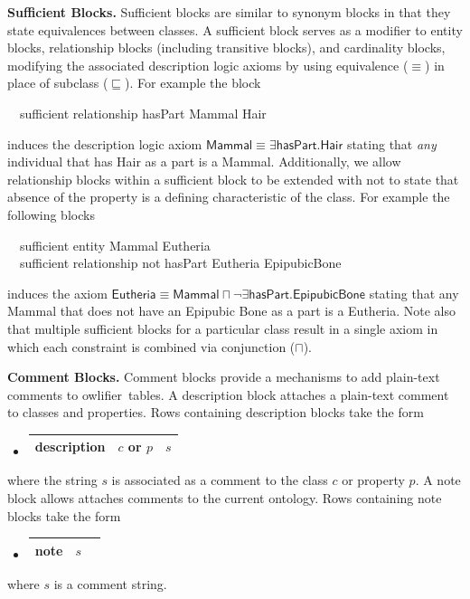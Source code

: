 \documentclass[preprint,number]{elsarticle}
\newcommand{\owlifier}{\textsf{owlifier}}
\newcommand{\myblock}[1]{\vspace{12pt}\noindent\textbf{#1}}
\begin{document}
\myblock{Sufficient Blocks.} Sufficient blocks are similar to synonym
blocks in that they state equivalences between classes. A sufficient
block serves as a modifier to entity blocks, relationship blocks
(including transitive blocks), and cardinality blocks, modifying the
associated description logic axioms by using equivalence ($\equiv$) in
place of subclass ($\sqsubseteq$). For example the block
\begin{tabbing}
  ~~\textsf{sufficient} \textsf{relationship} \textsf{hasPart} \textsf{Mammal} \textsf{Hair} 
\end{tabbing}
induces the description logic axiom $\textsf{Mammal} \equiv \exists
\textsf{hasPart}.\textsf{Hair}$ stating that \emph{any} individual
that has Hair as a part is a Mammal. Additionally, we allow
relationship blocks within a sufficient block to be extended with
\textsf{not} to state that absence of the property is a defining
characteristic of the class. For example the following blocks
\begin{tabbing}
  ~~\textsf{sufficient} \textsf{entity} \textsf{Mammal} \textsf{Eutheria} \\
  ~~\textsf{sufficient} \textsf{relationship not} \textsf{hasPart} \textsf{Eutheria} \textsf{EpipubicBone} 
\end{tabbing}
induces the axiom $\textsf{Eutheria} \equiv \textsf{Mammal} \sqcap
\neg \exists \textsf{hasPart} . \textsf{EpipubicBone}$ stating that
any Mammal that does not have an Epipubic Bone as a part is a
Eutheria. Note also that multiple sufficient blocks for a particular
class result in a single axiom in which each constraint is combined
via conjunction ($\sqcap$).


\myblock{Comment Blocks.} Comment blocks provide a mechanisms to add
plain-text comments to \owlifier\ tables. A description block attaches
a plain-text comment to classes and properties. Rows containing
description blocks take the form
\begin{itemize}
\item[]
  \begin{tabular}{|l|l|l|}\hline \textsf{description} & $c$ or $p$ & $s$
    \\ \hline
  \end{tabular}
\end{itemize}
where the string $s$ is associated as a comment to the class $c$ or
property $p$. A note block allows attaches comments to the current
ontology. Rows containing note blocks take the form
\begin{itemize}
\item[]
  \begin{tabular}{|l|l|l|}\hline \textsf{note} & $s$
\\ \hline
  \end{tabular}
\end{itemize}
where $s$ is a comment string.
\end{document}
